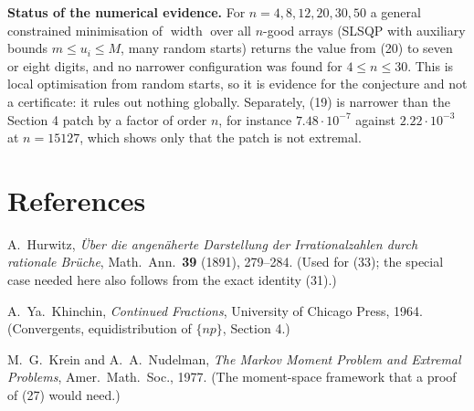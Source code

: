 \documentclass[12pt]{article}
\newcommand{\W}{\operatorname{width}}
\begin{document}
\textbf{Status of the numerical evidence.} For \(n=4,8,12,20,30,50\) a
general constrained minimisation of \(\W\) over all \(n\)-good arrays
(SLSQP with auxiliary bounds \(m\le u_i\le M\), many random starts)
returns the value from (20) to seven or eight digits, and no narrower
configuration was found for \(4\le n\le30\). This is local optimisation
from random starts, so it is evidence for the conjecture and not a
certificate: it rules out nothing globally. Separately, (19) is narrower
than the Section 4 patch by a factor of order \(n\), for instance
\(7.48\cdot10^{-7}\) against \(2.22\cdot10^{-3}\) at \(n=15127\), which
shows only that the patch is not extremal.

\section*{References}

\begin{enumerate}[label={[\arabic*]}]
\item A.~Hurwitz, \emph{\"Uber die angen\"aherte Darstellung der
Irrationalzahlen durch rationale Br\"uche}, Math.\ Ann.\ \textbf{39}
(1891), 279--284. (Used for (33); the special case needed here also
follows from the exact identity (31).)
\item A.~Ya.~Khinchin, \emph{Continued Fractions}, University of Chicago
Press, 1964. (Convergents, equidistribution of \(\{np\}\), Section 4.)
\item M.~G.~Krein and A.~A.~Nudelman, \emph{The Markov Moment Problem and
Extremal Problems}, Amer.\ Math.\ Soc., 1977. (The moment-space
framework that a proof of (27) would need.)
\end{enumerate}
\end{document}

